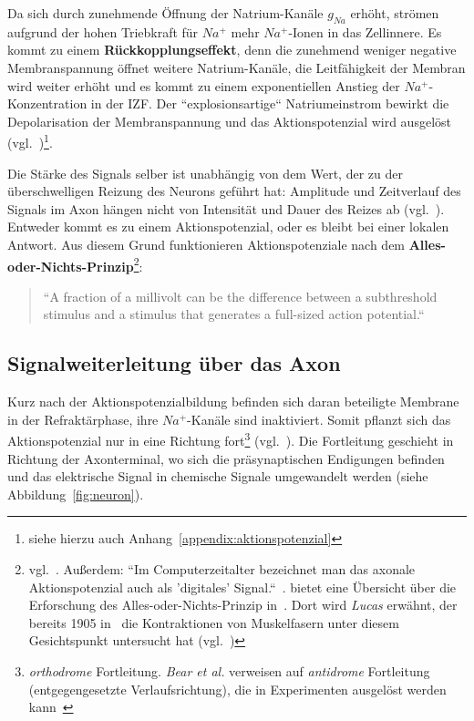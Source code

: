 {Da sich durch zunehmende Öffnung der Natrium-Kanäle $g_{Na}$ erhöht, strömen aufgrund der hohen Triebkraft für $Na^+$ mehr $Na^+$-Ionen in das Zellinnere. Es kommt zu einem \textbf{Rückkopplungseffekt}, denn die zunehmend weniger negative Membranspannung öffnet weitere Natrium-Kanäle, die Leitfähigkeit der Membran wird weiter erhöht und es kommt zu einem exponentiellen Anstieg der $Na^+$-Konzentration in der IZF. Der ``explosionsartige`` Natriumeinstrom bewirkt die Depolarisation der Membranspannung und das Aktionspotenzial wird ausgelöst (vgl.~\cite[69]{FE19})\footnote{
siehe hierzu auch Anhang~\ref{appendix:aktionspotenzial}
}.

Die Stärke des Signals selber ist unabhängig von dem Wert, der zu der überschwelligen Reizung des Neurons geführt hat: Amplitude und Zeitverlauf des Signals im Axon hängen nicht von Intensität und Dauer des Reizes ab (vgl.~\cite[75]{Jon19}). Entweder kommt es zu einem Aktionspotenzial, oder es bleibt bei einer lokalen Antwort. Aus diesem Grund funktionieren Aktionspotenziale nach dem \textbf{Alles-oder-Nichts-Prinzip}\footnote{vgl.~\cite[89]{BCP18}. Außerdem:
 ``Im Computerzeitalter bezeichnet man das axonale Aktionspotenzial auch als 'digitales' Signal.``~\cite[75]{Jon19}.  bietet eine Übersicht über die Erforschung des Alles-oder-Nichts-Prinzip in~\cite{Fra94}. Dort wird \textit{Lucas} erwähnt, der bereits 1905 in~\cite{Luc05} die Kontraktionen von Muskelfasern unter diesem Gesichtspunkt untersucht hat (vgl.~\cite[210]{Fra94})
}:

\blockquote[{\cite[157]{KSJ+13}}]{
 ``A fraction of a millivolt can be the difference between a subthreshold stimulus and a stimulus that generates a full-sized action potential.``
}

\subsection{Signalweiterleitung über das Axon}

Kurz nach der Aktionspotenzialbildung befinden sich daran beteiligte Membrane in der Refraktärphase, ihre $Na^+$-Kanäle sind inaktiviert. 
Somit pflanzt sich das Aktionspotenzial nur in eine Richtung fort\footnote{\textit{orthodrome} Fortleitung.
  \textit{Bear et al.} verweisen auf \textit{antidrome} Fortleitung (entgegengesetzte Verlaufsrichtung), die in Experimenten ausgelöst werden kann~\cite[106]{BCP18}
} (vgl.~\cite[106]{BCP18}).
Die Fortleitung geschieht in Richtung der Axonterminal, wo sich die präsynaptischen Endigungen befinden und das elektrische Signal in chemische Signale umgewandelt werden (siehe Abbildung~\ref{fig:neuron}).


}
